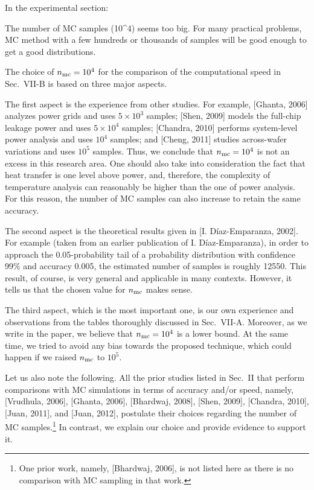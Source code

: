 \begin{reviewer}
In the experimental section:

The number of MC samples (10\^{}4) seems too big. For many practical problems, MC method with a few hundreds or thousands of samples will be good enough to get a good distributions.
\end{reviewer}
\begin{authors}
The choice of ${n_\text{mc}} = 10^4$ for the comparison of the computational speed in Sec.~VII-B is based on three major aspects.

The first aspect is the experience from other studies.
For example, [Ghanta, 2006] analyzes power grids and uses $5 \times 10^3$ samples; [Shen, 2009] models the full-chip leakage power and uses $5 \times 10^4$ samples; [Chandra, 2010] performs system-level power analysis and uses $10^4$ samples; and [Cheng, 2011] studies across-wafer variations and uses $10^5$ samples.
Thus, we conclude that ${n_\text{mc}} = 10^4$ is not an excess in this research area.
One should also take into consideration the fact that heat transfer is one level above power, and, therefore, the complexity of temperature analysis can reasonably be higher than the one of power analysis.
For this reason, the number of MC samples can also increase to retain the same accuracy.

The second aspect is the theoretical results given in [I. D\'{i}az-Emparanza, 2002].
For example (taken from an earlier publication of I. D\'{i}az-Emparanza), in order to approach the 0.05-probability tail of a probability distribution with confidence 99\% and accuracy 0.005, the estimated number of samples is roughly 12550.
This result, of course, is very general and applicable in many contexts.
However, it tells us that the chosen value for ${n_\text{mc}}$ makes sense.

The third aspect, which is the most important one, is our own experience and observations from the tables thoroughly discussed in Sec.~VII-A.
Moreover, as we write in the paper, we believe that ${n_\text{mc}} = 10^4$ is a lower bound.
At the same time, we tried to avoid any bias towards the proposed technique, which could happen if we raised ${n_\text{mc}}$ to $10^5$.

Let us also note the following.
All the prior studies listed in Sec.~II that perform comparisons with MC simulations in terms of accuracy and/or speed, namely, [Vrudhula, 2006], [Ghanta, 2006], [Bhardwaj, 2008], [Shen, 2009], [Chandra, 2010], [Juan, 2011], and [Juan, 2012], postulate their choices regarding the number of MC samples.\footnote{One prior work, namely, [Bhardwaj, 2006], is not listed here as there is no comparison with MC sampling in that work.}
In contrast, we explain our choice and provide evidence to support it.

\begin{actions}
\end{actions}
\end{authors}

